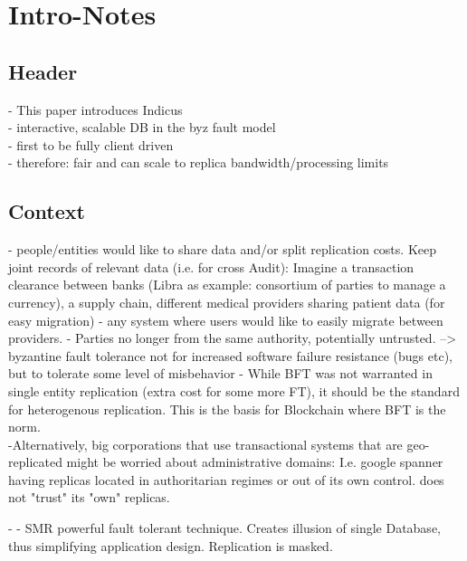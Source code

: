 \section{Intro-Notes}

\subsection{Header}

 - This paper introduces Indicus\\
 - interactive, scalable DB in the byz fault model\\
 - first to be fully client driven\\
 - therefore: fair and can scale to replica bandwidth/processing limits
 
 \subsection{Context}
 - people/entities would like to share data and/or split replication costs. Keep joint records of relevant data (i.e. for cross Audit): Imagine a transaction clearance between banks  (Libra as example: consortium of parties to manage a currency), a supply chain, different medical providers sharing patient data (for easy migration) - any system where users would like to easily migrate between providers.
 - Parties no longer from the same authority, potentially untrusted. --> byzantine fault tolerance not for increased software failure resistance (bugs etc), but to tolerate some level of misbehavior
 - While BFT was not warranted in single entity replication (extra cost for some more FT), it should be the standard for heterogenous replication. This is the basis for Blockchain where BFT is the norm.\\
 -Alternatively, big corporations that use transactional systems that are geo-replicated might be worried about administrative domains: I.e. google spanner having replicas located in authoritarian regimes or out of its own control. does not "trust" its "own" replicas.
 
 -
 - SMR powerful fault tolerant technique. Creates illusion of single Database, thus simplifying application design. Replication is masked.
  \\
 
